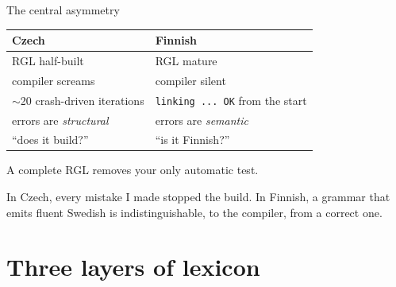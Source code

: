\documentclass[10pt,aspectratio=169]{beamer}
\begin{document}
\begin{frame}{The central asymmetry}
  \begin{center}
  \begin{tabular}{ll}
    \toprule
    \textbf{Czech} & \textbf{Finnish} \\
    \midrule
    RGL half-built & RGL mature \\
    compiler screams & compiler silent \\
    $\sim$20 crash-driven iterations & \texttt{linking ... OK} from the start \\
    errors are \emph{structural} & errors are \emph{semantic} \\
    ``does it build?'' & ``is it Finnish?'' \\
    \bottomrule
  \end{tabular}
  \end{center}

  \vspace{1.2em}
  \begin{center}
  \Large A complete RGL removes your only automatic test.
  \end{center}

  \vspace{0.8em}
  \small
  In Czech, every mistake I made stopped the build. In Finnish, a grammar that
  emits fluent Swedish is indistinguishable, to the compiler, from a correct one.
\end{frame}

\section{Three layers of lexicon}
\end{document}
